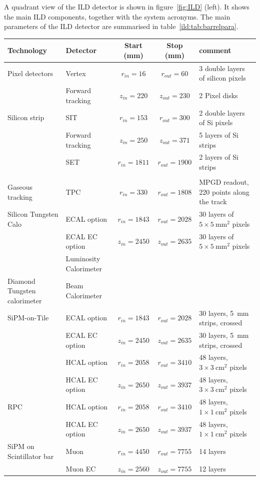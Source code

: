 \documentclass[%
 amsmath,amssymb,
 aps,
]{revtex4-1}
\renewcommand{\toprule}{\hline}
\newcommand{\midrule}{\hline}
\begin{document}
A quadrant view of the ILD detector is shown in figure~\ref{fig:ILD} (left). It shows the main ILD components, together with the system acronyms. The main parameters of the ILD detector are summarised in table~\ref{ild:tab:barrelpara}.
\begin{table}[th]
    \centering
    \begin{tabular}{|l|l|c|c|p{4cm}|}
    \toprule
        {\bf Technology} & {\bf Detector} & {\bf Start (mm)}   & {\bf Stop (mm)} & {\bf comment} \\
        \midrule
Pixel detectors & Vertex & $r_{in}=16$   & $r_{out}=60$   & 3 double layers of silicon pixels \\
& Forward tracking  & $z_{in}=220$ & $z_{out}=230$ & 2 Pixel disks \\
\midrule
Silicon strip   & SIT    & $r_{in}=153$  & $r_{out}=300$  & 2 double layers of Si pixels            \\
& Forward tracking  & $z_{in}=250$ & $z_{out}=371$ & 5 layers of Si strips\\
                & SET    & $r_{in}=1811$ & $r_{out}=1900$ & 2 layers of Si strips           \\
                & & & & \\
Gaseous tracking & TPC & $r_{in}=330$ & $r_{out}=1808$ & MPGD readout, 220 points along the track\\
\midrule
Silicon Tungsten Calo & ECAL option& $r_{in}=1843$ & $r_{out}=2028$ & 30 layers of $5\times 5~\mathrm{mm}^2$ pixels \\
& ECAL EC option & $z_{in}=2450$ & $z_{out}=2635$ & 30 layers of $5\times 5~\mathrm{mm}^2$ pixels \\
& Luminosity Calorimeter & & & \\
\midrule
Diamond Tungsten calorimeter & Beam Calorimeter & &&\\
\midrule
SiPM-on-Tile & ECAL option   & $r_{in}=1843$ & $r_{out}=2028$ & 30 layers, 5~mm strips, crossed\\
& ECAL EC option& $z_{in}=2450$ & $z_{out}=2635$ & 30 layers, 5~mm strips, crossed\\
             & HCAL option   & $r_{in}=2058$ & $r_{out}=3410$ & 48 layers, $3\times 3~\mathrm{cm}^2$ pixels\\
             & HCAL EC option& $z_{in}=2650$ & $z_{out}=3937$ & 48 layers, $3\times 3~\mathrm{cm}^2$ pixels\\
\midrule
RPC          & HCAL option   & $r_{in}=2058$ & $r_{out}=3410$ & 48 layers, $1 \times 1 ~\mathrm{cm}^2$ pixels \\
& HCAL EC option & $z_{in}=2650$ & $z_{out}=3937$ & 48 layers, $1 \times 1~\mathrm{cm}^2$ pixels\\
\midrule
SiPM on Scintillator bar & Muon & $r_{in}=4450$ & $r_{out}=7755$ & 14 layers \\
& Muon EC & $z_{in}=2560$ & $z_{out}=7755$ & 12 layers \\


\end{tabular}
\end{table}
\end{document}
